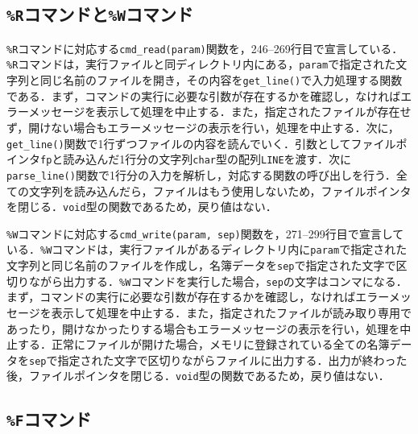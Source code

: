 \subsection{\texttt{\%R}コマンドと\texttt{\%W}コマンド}

\verb|%R|コマンドに対応する\verb|cmd_read(param)|関数を，246--269行目で宣言している．\verb|%R|コマンドは，実行ファイルと同ディレクトリ内にある，\verb|param|で指定された文字列と同じ名前のファイルを開き，その内容を\verb|get_line()|で入力処理する関数である．まず，コマンドの実行に必要な引数が存在するかを確認し，なければエラーメッセージを表示して処理を中止する．また，指定されたファイルが存在せず，開けない場合もエラーメッセージの表示を行い，処理を中止する．次に，\verb|get_line()|関数で1行ずつファイルの内容を読んでいく．引数としてファイルポインタ\verb|fp|と読み込んだ1行分の文字列\verb|char|型の配列\verb|LINE|を渡す．次に\verb|parse_line()|関数で1行分の入力を解析し，対応する関数の呼び出しを行う．全ての文字列を読み込んだら，ファイルはもう使用しないため，ファイルポインタを閉じる．\verb|void|型の関数であるため，戻り値はない．

\verb|%W|コマンドに対応する\verb|cmd_write(param, sep)|関数を，271--299行目で宣言している．\verb|%W|コマンドは，実行ファイルがあるディレクトリ内に\verb|param|で指定された文字列と同じ名前のファイルを作成し，名簿データを\verb|sep|で指定された文字で区切りながら出力する．\verb|%W|コマンドを実行した場合，\verb|sep|の文字はコンマになる．まず，コマンドの実行に必要な引数が存在するかを確認し，なければエラーメッセージを表示して処理を中止する．また，指定されたファイルが読み取り専用であったり，開けなかったりする場合もエラーメッセージの表示を行い，処理を中止する．正常にファイルが開けた場合，メモリに登録されている全ての名簿データを\verb|sep|で指定された文字で区切りながらファイルに出力する．出力が終わった後，ファイルポインタを閉じる．\verb|void|型の関数であるため，戻り値はない．

\subsection{\texttt{\%F}コマンド}

